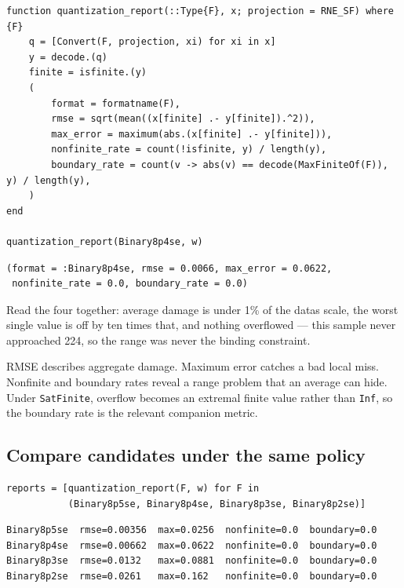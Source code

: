 \begin{minipage}{\linewidth}
\begin{verbatim}
function quantization_report(::Type{F}, x; projection = RNE_SF) where {F}
    q = [Convert(F, projection, xi) for xi in x]
    y = decode.(q)
    finite = isfinite.(y)
    (
        format = formatname(F),
        rmse = sqrt(mean((x[finite] .- y[finite]).^2)),
        max_error = maximum(abs.(x[finite] .- y[finite])),
        nonfinite_rate = count(!isfinite, y) / length(y),
        boundary_rate = count(v -> abs(v) == decode(MaxFiniteOf(F)), y) / length(y),
    )
end

quantization_report(Binary8p4se, w)
\end{verbatim}




\begin{verbatim}
(format = :Binary8p4se, rmse = 0.0066, max_error = 0.0622,
 nonfinite_rate = 0.0, boundary_rate = 0.0)
\end{verbatim}
\end{minipage}




Read the four together: average damage is under 1\% of the data{\textquotesingle}s scale, the worst single value is off by ten times that, and nothing overflowed — this sample never approached 224, so the range was never the binding constraint.



RMSE describes aggregate damage. Maximum error catches a bad local miss. Nonfinite and boundary rates reveal a range problem that an average can hide. Under \texttt{SatFinite}, overflow becomes an extremal finite value rather than \texttt{Inf}, so the boundary rate is the relevant companion metric.



\subsection{Compare candidates under the same policy}



\label{8933269318953993397}{}



\begin{minipage}{\linewidth}
\begin{verbatim}
reports = [quantization_report(F, w) for F in
           (Binary8p5se, Binary8p4se, Binary8p3se, Binary8p2se)]
\end{verbatim}




\begin{verbatim}
Binary8p5se  rmse=0.00356  max=0.0256  nonfinite=0.0  boundary=0.0
Binary8p4se  rmse=0.00662  max=0.0622  nonfinite=0.0  boundary=0.0
Binary8p3se  rmse=0.0132   max=0.0881  nonfinite=0.0  boundary=0.0
Binary8p2se  rmse=0.0261   max=0.162   nonfinite=0.0  boundary=0.0
\end{verbatim}
\end{minipage}




